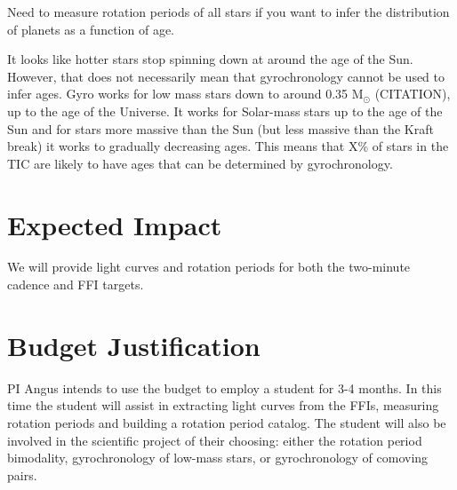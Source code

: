 \documentclass[useAMS, usenatbib, preprint, 12pt]{aastex}
\begin{document}
Need to measure rotation periods of all stars if you want to infer the
distribution of planets as a function of age.

It looks like hotter stars stop spinning down at around the age of the Sun.
However, that does not necessarily mean that gyrochronology cannot be used to
infer ages.
Gyro works for low mass stars down to around 0.35 M$_\odot$ (CITATION), up to
the age of the Universe.
It works for Solar-mass stars up to the age of the Sun and for stars more
massive than the Sun (but less massive than the Kraft break) it works to
gradually decreasing ages.
This means that X\% of stars in the TIC are likely to have ages that can be
determined by gyrochronology.

\section{Expected Impact}
We will provide light curves and rotation periods for both the two-minute
cadence and FFI targets.

\section{Budget Justification}
PI Angus intends to use the budget to employ a student for 3-4 months.
In this time the student will assist in extracting light curves from the FFIs,
measuring rotation periods and building a rotation period catalog.
The student will also be involved in the scientific project of their choosing:
either the rotation period bimodality, gyrochronology of low-mass stars, or
gyrochronology of comoving pairs.


\end{document}

